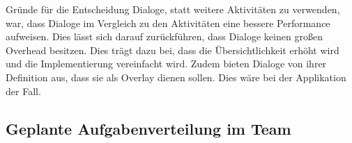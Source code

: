 
Gründe für die Entscheidung Dialoge, statt weitere Aktivitäten zu verwenden, war, dass Dialoge im Vergleich zu den Aktivitäten eine bessere Performance aufweisen. Dies lässt sich darauf zurückführen, dass Dialoge keinen großen Overhead besitzen. Dies trägt dazu bei, dass die Übersichtlichkeit erhöht wird und die Implementierung vereinfacht wird. Zudem bieten Dialoge von ihrer Definition aus, dass sie als Overlay dienen sollen. Dies wäre bei der Applikation der Fall. 

\clearpage

\subsection{Geplante Aufgabenverteilung im Team}

